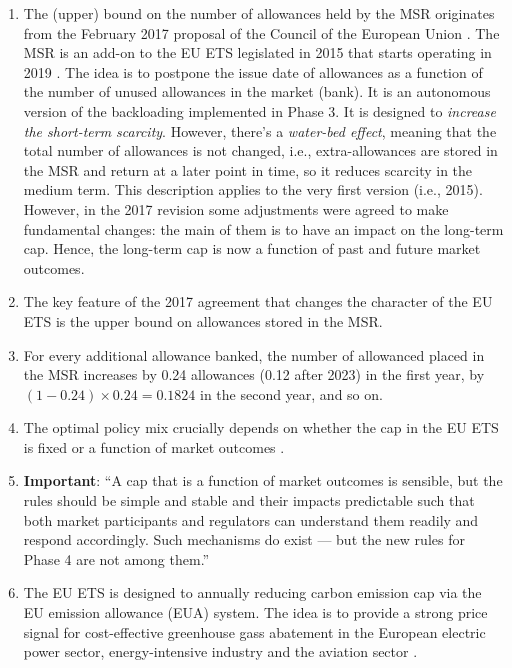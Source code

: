 \begin{enumerate}[wide, itemsep=0cm, topsep=0cm, label=\textbf{\arabic{enumi}.}]
	\item The  (upper) bound on the number of allowances held by the MSR originates from the February 2017 proposal of the Council of the European Union \cite{perino2017eu}. The MSR is an add-on to the EU ETS legislated in 2015 that starts operating in 2019 \cite{perino2018new}. The idea is to postpone the issue date of allowances as a function of the number of unused allowances in the market (bank). It is an autonomous version of the backloading implemented in Phase 3. It is designed to \emph{increase the short-term scarcity}. However, there's a \emph{water-bed effect}, meaning that the total number of allowances is not changed, i.e., extra-allowances are stored in the MSR and return at a later point in time, so it reduces scarcity in the medium term. This description applies to the very first version (i.e., 2015). However, in the 2017 revision some adjustments were agreed to make fundamental changes: the main of them is to have an impact on the long-term cap. Hence, the long-term cap is now a function of past and future market outcomes.
	
	\item The key feature of the 2017 agreement that changes the character of the EU ETS is the upper bound on allowances stored in the MSR.
	
	\item For every additional allowance banked, the number of allowanced placed in the MSR increases by 0.24 allowances (0.12 after 2023) in the first year, by $(1-0.24)\times 0.24 = 0.1824$ in the second year, and so on.
	
	\item The optimal policy mix crucially  depends on whether the cap in the EU ETS is fixed or a function of market outcomes \cite{perino2018new}.
	
	\item \textbf{Important}: ``A cap that is a function of market outcomes is sensible, but the rules should be simple and stable and their impacts predictable such that both market participants and regulators can understand them readily and respond accordingly. Such mechanisms do exist — but the new rules for Phase 4 are not among them.'' \cite{perino2018new}
	
	\item The EU ETS is designed to annually reducing carbon emission cap via the EU emission allowance (EUA) system. The idea is to provide a strong price signal for cost-effective greenhouse gass abatement in the European electric power sector, energy-intensive industry and the aviation sector \cite{bruninx2020long}.
	

\end{enumerate}

